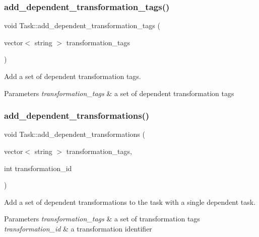 \subsubsection{\texorpdfstring{add\+\_\+dependent\+\_\+transformation\+\_\+tags()}{add\_dependent\_transformation\_tags()}}
{\footnotesize\ttfamily void Task\+::add\+\_\+dependent\+\_\+transformation\+\_\+tags (\begin{DoxyParamCaption}\item[{vector$<$ string $>$}]{transformation\+\_\+tags }\end{DoxyParamCaption})\hspace{0.3cm}{\ttfamily [protected]}}

Add a set of dependent transformation tags. 
\begin{DoxyParams}{Parameters}
{\em transformation\+\_\+tags} & a set of dependent transformation tags \\
\hline
\end{DoxyParams}
\mbox{\label{classTask_a2307623af7ceb989b236a2c5dd0f715c}} 
\subsubsection{\texorpdfstring{add\+\_\+dependent\+\_\+transformations()}{add\_dependent\_transformations()}\hspace{0.1cm}{\footnotesize\ttfamily [1/2]}}
{\footnotesize\ttfamily void Task\+::add\+\_\+dependent\+\_\+transformations (\begin{DoxyParamCaption}\item[{vector$<$ string $>$}]{transformation\+\_\+tags,  }\item[{int}]{transformation\+\_\+id }\end{DoxyParamCaption})}

Add a set of dependent transformations to the task with a single dependent task. 
\begin{DoxyParams}{Parameters}
{\em transformation\+\_\+tags} & a set of transformation tags \\
\hline
{\em transformation\+\_\+id} & a transformation identifier \\
\hline
\end{DoxyParams}
\mbox{\label{classTask_a381ed34fcd5d4e429fde0bb56ae5553a}} 
